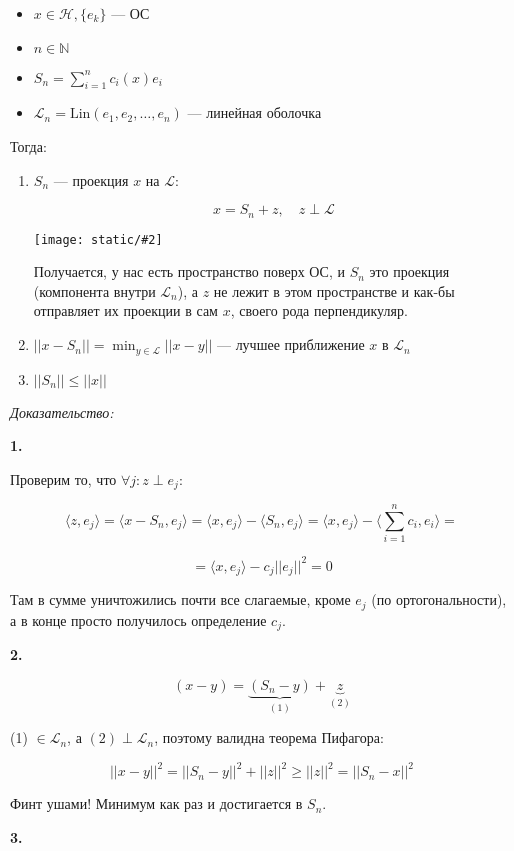 \documentclass{article}
\def\images#1#2{\begin{center}\texttt{[image: static/\#2]}\end{center}}
\def\sk#1#2{\langle #1, #2 \rangle}
\begin{document}
\begin{itemize}
    \item $x \in \mathcal{H}, \{e_k\}$ --- ОС
    \item $n \in \mathbb{N}$
    \item $S_n = \sum_{i = 1}^{n} c_i(x)e_i$
    \item $\mathcal{L}_n = \text{Lin}(e_1, e_2, \ldots, e_n)$ --- линейная оболочка
\end{itemize}

Тогда:

\begin{enumerate}
    \item $S_n$ --- проекция $x$ на $\mathcal{L}$:
    
    \[x = S_n + z, \quad z \perp \mathcal{L}\]

    \images{0.3}{ner_bessel.jpg}

    Получается, у нас есть пространство поверх ОС, и $S_n$ это проекция (компонента внутри $\mathcal{L}_n$), а $z$ не лежит в этом пространстве и как-бы отправляет их проекции в сам $x$, своего рода перпендикуляр.

    \item $||x - S_n|| = \min_{y \in \mathcal{L}} ||x - y||$ --- лучшее приближение $x$ в $\mathcal{L}_n$
    \item $||S_n|| \le ||x||$
\end{enumerate}

\textit{Доказательство:}

\textbf{1. }

Проверим то, что $\forall j: z \perp e_j$: 

\[\sk{z}{e_j} = \sk{x - S_n}{e_j} = \sk{x}{e_j} - \sk{S_n}{e_j} = \sk{x}{e_j} - \sk{\sum_{i = 1}^{n} c_i}{e_i} =\]

\[= \sk{x}{e_j} - c_j ||e_j||^2 = 0\]

Там в сумме уничтожились почти все слагаемые, кроме $e_j$ (по ортогональности), а в конце просто получилось определение $c_j$.

\textbf{2. }

\[(x - y) = \underbrace{(S_n - y)}_{(1)}+ \underbrace{z}_{(2)}\]

(1) $\in \mathcal{L}_n$, а $(2) \perp \mathcal{L}_n$, поэтому валидна теорема Пифагора:

\[||x - y||^2 = ||S_n - y||^2 + ||z||^2 \ge ||z||^2 = ||S_n - x||^2\]

Финт ушами! Минимум как раз и достигается в $S_n$.

\textbf{3. }
\end{document}
